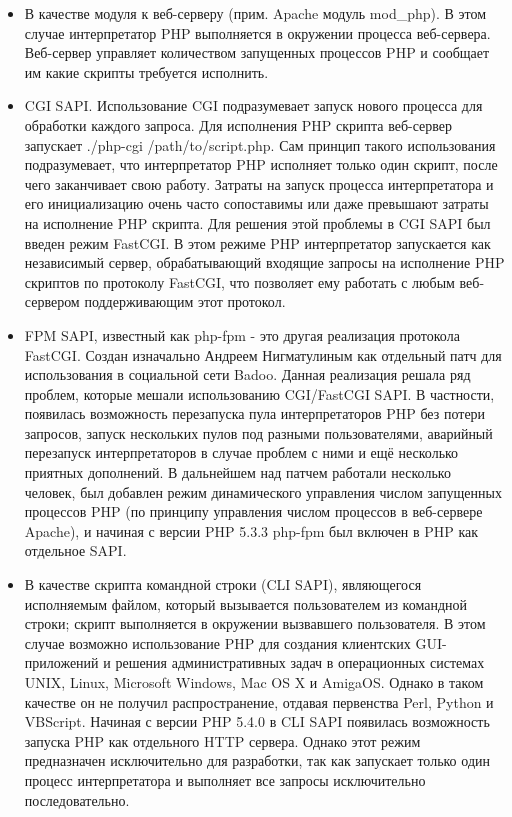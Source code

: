 \begin{itemize}
    \item   В качестве модуля к веб-серверу (прим. Apache модуль mod\_php). В этом случае интерпретатор PHP выполняется в окружении процесса веб-сервера. Веб-сервер управляет количеством запущенных процессов PHP и сообщает им какие скрипты требуется исполнить.

    \item   CGI SAPI. Использование CGI подразумевает запуск нового процесса для обработки каждого запроса. Для исполнения PHP скрипта веб-сервер запускает ./php-cgi /path/to/script.php. Сам принцип такого использования подразумевает, что интерпретатор PHP исполняет только один скрипт, после чего заканчивает свою работу. Затраты на запуск процесса интерпретатора и его инициализацию очень часто сопоставимы или даже превышают затраты на исполнение PHP скрипта. Для решения этой проблемы в CGI SAPI был введен режим FastCGI. В этом режиме PHP интерпретатор запускается как независимый сервер, обрабатывающий входящие запросы на исполнение PHP скриптов по протоколу FastCGI, что позволяет ему работать с любым веб-сервером поддерживающим этот протокол.

    \item   FPM SAPI, известный как php-fpm - это другая реализация протокола FastCGI. Создан изначально Андреем Нигматулиным как отдельный патч для использования в социальной сети Badoo. Данная реализация решала ряд проблем, которые мешали использованию CGI/FastCGI SAPI. В частности, появилась возможность перезапуска пула интерпретаторов PHP без потери запросов, запуск нескольких пулов под разными пользователями, аварийный перезапуск интерпретаторов в случае проблем с ними и ещё несколько приятных дополнений. В дальнейшем над патчем работали несколько человек, был добавлен режим динамического управления числом запущенных процессов PHP (по принципу управления числом процессов в веб-сервере Apache), и начиная с версии PHP 5.3.3 php-fpm был включен в PHP как отдельное SAPI.

    \item   В качестве скрипта командной строки (CLI SAPI), являющегося исполняемым файлом, который вызывается пользователем из командной строки; скрипт выполняется в окружении вызвавшего пользователя. В этом случае возможно использование PHP для создания клиентских GUI-приложений и решения административных задач в операционных системах UNIX, Linux, Microsoft Windows, Mac OS X и AmigaOS. Однако в таком качестве он не получил распространение, отдавая первенства Perl, Python и VBScript.
    Начиная с версии PHP 5.4.0 в CLI SAPI появилась возможность запуска PHP как отдельного HTTP сервера. Однако этот режим предназначен исключительно для разработки, так как запускает только один процесс интерпретатора и выполняет все запросы исключительно последовательно.
\end{itemize}



